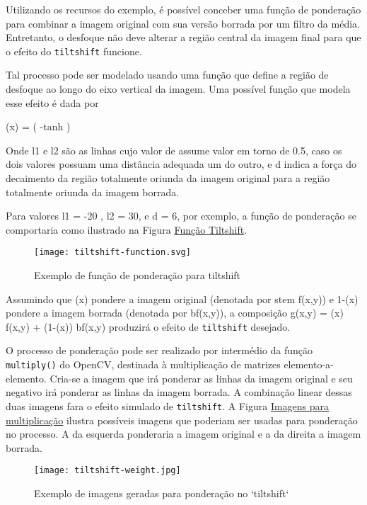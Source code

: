 \documentclass[11pt]{amsbook}
\begin{document}
Utilizando os recursos do exemplo, é possível conceber uma função de
ponderação para combinar a imagem original com sua versão borrada por
um filtro da média. Entretanto, o desfoque não deve alterar a região
central da imagem final para que o efeito do \texttt{tiltshift} funcione.


Tal processo pode ser modelado usando uma função que define a região
de desfoque ao longo do eixo vertical da imagem. Uma possível função
que modela esse efeito é dada por


\alpha (x) =  ( \tanh {}-tanh )


Onde l1 e l2 são as linhas cujo valor de
\alpha assume valor em torno de 0.5, caso os dois valores
possuam uma distância adequada um do outro, e d
indica a força do decaimento da região totalmente oriunda da imagem
original para a região totalmente oriunda da imagem borrada.


Para valores l1 = -20 , l2 = 30, e
d = 6, por exemplo, a função de ponderação se
comportaria como ilustrado na Figura \hyperlink{fig-tiltshiftfunction}{Função Tiltshift}.


\begin{figure}[h]{}
\centering\texttt{[image: tiltshift-function.svg]}
\caption{Exemplo de função de ponderação para tiltshift}

\end{figure}

Assumindo que \alpha(x) pondere a imagem original (denotada por
stem f(x,y)) e 1-\alpha(x) pondere a imagem borrada
(denotada por bf(x,y)), a composição g(x,y) = \alpha(x)
f(x,y) + (1-\alpha(x)) bf(x,y) produzirá o efeito de \texttt{tiltshift}
desejado.


O processo de ponderação pode ser realizado por intermédio da função
\texttt{multiply()} do OpenCV, destinada à multiplicação de matrizes
elemento-a-elemento. Cria-se a imagem que irá ponderar as linhas da
imagem original e seu negativo irá ponderar as linhas da imagem
borrada. A combinação linear dessas duas imagens fara o efeito
simulado de \texttt{tiltshift}. A Figura \hyperlink{fig-tiltshiftfunctionpondera}{Imagens para multiplicação} ilustra
possíveis imagens que poderiam ser usadas para ponderação no
processo. A da esquerda ponderaria a imagem original e a da direita a
imagem borrada.


\begin{figure}[h]{}
\centering\texttt{[image: tiltshift-weight.jpg]}
\caption{Exemplo de imagens geradas para ponderação no `tiltshift`}

\end{figure}
\end{document}

